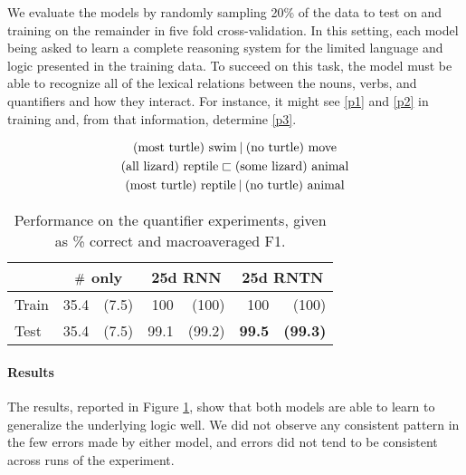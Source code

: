 
We evaluate the models by randomly sampling 20\% of the data to
test on and training on the remainder in five fold cross-validation.
In this setting, each model being asked to learn a
complete reasoning system for the limited language and logic presented
in the training data. To succeed on this task, the model must be able
to recognize all of the lexical relations between the nouns, verbs,
and quantifiers and how they interact. For instance, it might see
\eqref{p1} and \eqref{p2} in training and, from that information,
determine \eqref{p3}.

\vspace{-0.6cm}
\begin{gather}
  \text{(most turtle) swim} \mathbin{|} \text{(no turtle) move}\label{p1}
  \\
  \text{(all lizard) reptile} \sqsubset  \text{(some lizard) animal}\label{p2}
  \\
  \text{(most turtle) reptile} \mathbin{|} \text{(no turtle) animal}\label{p3}
\end{gather}\vspace{-0.8cm}

\begin{table}[tp]
  \centering \small
  \begin{tabular}{ l r@{ \ }r r@{ \ }r r@{ \ }r }
    \toprule
    ~&\multicolumn{2}{c}{$\mathbin{\#}$ only} & \multicolumn{2}{c}{25d RNN}  & \multicolumn{2}{c}{25d RNTN}\\
    \midrule
    Train & 35.4 &(7.5) &	100&		(100)&	100&	(100)\\	
    Test & 35.4 &(7.5) &	99.1&(99.2)& \textbf{99.5} & \textbf{(99.3)}\\
    \bottomrule
  \end{tabular}
  \caption{Performance on the quantifier experiments, given as \% correct and macroaveraged F1.}
  \label{qresultstable}
\end{table} 
%
%
\paragraph{Results} The results, reported in Figure \ref{qresultstable}, show that both models are able to learn to generalize the underlying logic well. We did not observe any consistent pattern in the few errors made by either model, and errors did not tend to be consistent across runs of the experiment.
